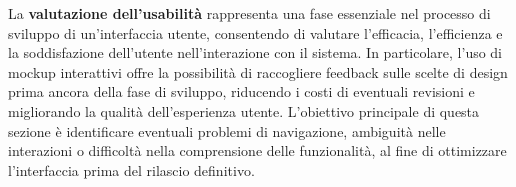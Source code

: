 La \textbf{valutazione dell'usabilità} rappresenta una fase essenziale nel processo di sviluppo di un’interfaccia utente, consentendo di valutare l'efficacia, l’efficienza e la soddisfazione dell’utente nell’interazione con il sistema. In particolare, l'uso di mockup interattivi offre la possibilità di raccogliere feedback sulle scelte di design prima ancora della fase di sviluppo, riducendo i costi di eventuali revisioni e migliorando la qualità dell’esperienza utente.
\newline
L'obiettivo principale di questa sezione è identificare eventuali problemi di navigazione, ambiguità nelle interazioni o difficoltà nella comprensione delle funzionalità, al fine di ottimizzare l'interfaccia prima del rilascio definitivo.



